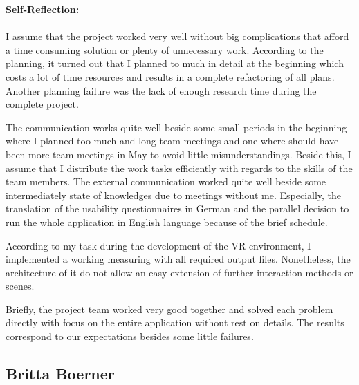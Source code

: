 \textbf{Self-Reflection:}\\ \\
I assume that the project worked very well without big complications that afford a time consuming solution or plenty of unnecessary work. According to the planning, it turned out that I planned to much in detail at the beginning which costs a lot of time resources and results in a complete refactoring of all plans. Another planning failure was the lack of enough research time during the complete project. 

The communication works quite well beside some small periods in the beginning where I planned too much and long team meetings and one where should have been more team meetings in May to avoid little misunderstandings. Beside this, I assume that I distribute the work tasks efficiently with regards to the skills of the team members. The external communication worked quite well beside some intermediately state of knowledges due to meetings without me. Especially, the translation of the usability questionnaires in German and the parallel decision to run the whole application in English language because of the brief schedule. 

According to my task during the development of the VR environment, I implemented a working measuring with all required output files. Nonetheless, the architecture of it do not allow an easy extension of further interaction methods or scenes. 

Briefly, the project team worked very good together and solved each problem directly with focus on the entire application without rest on details. The results correspond to our expectations besides some little failures.
\subsection{Britta Boerner} \label{sec:SABritta}

